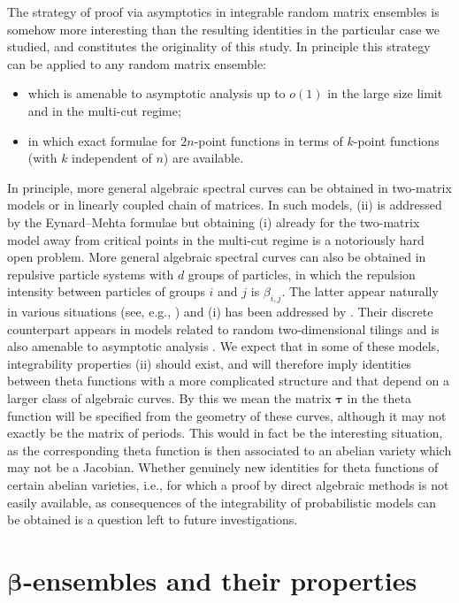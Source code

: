 \documentclass[10pt,a4paper]{amsart}
\numberwithin{equation}{section}
\begin{document}
The strategy of proof via asymptotics in integrable random matrix ensembles is somehow more interesting than the resulting identities in the particular case we studied, and constitutes the originality of this study. In principle this strategy can be applied to any random matrix ensemble:
\begin{itemize}\itemsep=0pt
\item[(i)] which is amenable to asymptotic analysis up to $o(1)$ in the large size limit and in the multi-cut regime;
\item[(ii)] in which exact formulae for $2n$-point functions in terms of $k$-point functions (with $k$ independent of $n$) are available.
\end{itemize}
In principle, more general algebraic spectral curves can be obtained in two-matrix models or in linearly coupled chain of matrices. In such models, (ii) is addressed by the Eynard--Mehta formulae \cite{EM} but obtaining (i) already for the two-matrix model away from critical points in the multi-cut regime is a notoriously hard open problem. More general algebraic spectral curves can also be obtained in repulsive particle systems with $d$ groups of particles, in which the repulsion intensity between particles of groups $i$ and $j$ is $\beta_{i,j}$. The latter appear naturally in various situations (see, e.g., \cite{BEO,BEW}) and (i) has been addressed by \cite{BGK}. Their discrete counterpart appears in models related to random two-dimensional tilings and is also amenable to asymptotic analysis \cite{BGG}. We expect that in some of these models, integrability properties (ii) should exist, and will therefore imply identities between theta functions with a more complicated structure and that depend on a larger class of algebraic curves. By this we mean the matrix $\boldsymbol{\tau}$ in the theta function will be specified from the geometry of these curves, although it may not exactly be the matrix of periods. This would in fact be the interesting situation, as the corresponding theta function is then associated to an abelian variety which may not be a Jacobian. Whether genuinely new identities for theta functions of certain abelian varieties, i.e., for which a proof by direct algebraic methods is not easily available, as consequences of the integrability of probabilistic models can be obtained is a question left to future investigations.


\section[beta-ensembles and their properties]{$\boldsymbol{\beta}$-ensembles and their properties}
\end{document}
